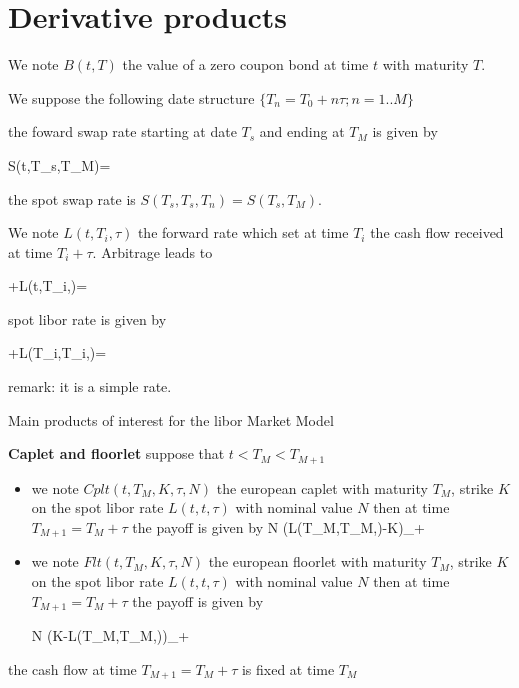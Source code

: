\section{Derivative products}



We note $B(t,T)$ the value of a zero coupon bond at time $t$ with maturity $T$.  

We suppose the following date structure $\lbrace T_n=T_0+n\tau ; n=1..M \rbrace $ 

the foward swap rate starting at date $T_s$ and ending at $T_M$ is given by 


\ban
S(t,T_s,T_M)=
\ean

the spot swap rate is $S(T_s,T_s,T_n)=S(T_s,T_M)$.

We note $L(t,T_i,\tau)$ the forward rate which set at time $T_i$ the cash flow received at time $T_i+\tau$. Arbitrage leads to  

+\tau L(t,T_i,\tau)= 
\ea

spot libor rate is given by 

+\tau L(T_i,T_i,\tau)= 
\ea

remark: it is a simple rate.


Main products of interest for the libor Market Model

{\bf Caplet and floorlet}
suppose that  $t<T_M<T_{M+1}$

\begin{itemize}
\item we note $Cplt(t,T_M,K,\tau,N)$ the european caplet with  maturity $T_M$, strike $K$  on the spot libor rate $L(t,t,\tau)$ with  nominal value $N$ then at time $T_{M+1}=T_M+\tau$ the payoff is given by 
\ban
N \tau (L(T_M,T_M,\tau)-K)_+
\ean

\item we note $Flt(t,T_M,K,\tau,N)$ the european  floorlet  with maturity $T_M$, strike $K$  on the spot libor rate $L(t,t,\tau)$ with nominal value $N$ then at time $T_{M+1}=T_M+\tau$ the payoff is given by 

\ban
N \tau (K-L(T_M,T_M,\tau))_+
\ean
\end{itemize}

the cash flow at time $T_{M+1}=T_M+\tau$ is fixed at time $T_M$



